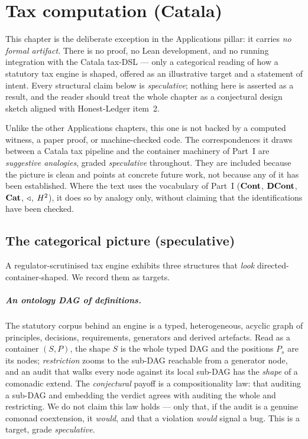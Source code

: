 \chapter{Tax computation (Catala)}
\label{ch:tax}
This chapter is the deliberate exception in the Applications pillar: it carries
\emph{no formal artifact}. There is no proof, no Lean development, and no running
integration with the Catala tax-DSL --- only a categorical reading of how a
statutory tax engine is shaped, offered as an illustrative target and a statement
of intent. Every structural claim below is \emph{speculative}; nothing here is
asserted as a result, and the reader should treat the whole chapter as a
conjectural design sketch aligned with Honest-Ledger item~2.

\begin{remark}\label{rem:tax-noartifact}
Unlike the other Applications chapters, this one is not backed by a computed
witness, a paper proof, or machine-checked code. The correspondences it draws
between a Catala tax pipeline and the container machinery of Part~I are
\emph{suggestive analogies}, graded \emph{speculative} throughout. They are
included because the picture is clean and points at concrete future work, not
because any of it has been established. Where the text uses the vocabulary of
Part~I ($\mathbf{Cont}$, $\mathbf{DCont}$, $\mathbf{Cat}$, $\triangleleft$, $H^2$), it does so by analogy only,
without claiming that the identifications have been checked.
\end{remark}

\section{The categorical picture (speculative)}\label{sec:tax-picture}

A regulator-scrutinised tax engine exhibits three structures that \emph{look}
directed-container-shaped. We record them as targets.

\paragraph{An ontology DAG of definitions.} The statutory corpus behind an engine
is a typed, heterogeneous, acyclic graph of principles, decisions, requirements,
generators and derived artefacts. Read as a container $(S,P)$, the shape $S$ is
the whole typed DAG and the positions $P_s$ are its nodes; \emph{restriction}
zooms to the sub-DAG reachable from a generator node, and an audit that walks
every node against its local sub-DAG has the \emph{shape} of a comonadic
$\mathrm{extend}$. The \emph{conjectural} payoff is a compositionality law: that
auditing a sub-DAG and embedding the verdict agrees with auditing the whole and
restricting. We do not claim this law holds --- only that, if the audit is a genuine
comonad coextension, it \emph{would}, and that a violation \emph{would} signal a
bug. This is a target, grade \emph{speculative}.

